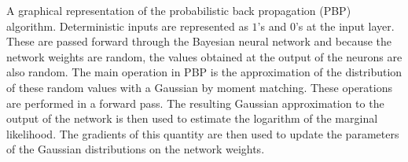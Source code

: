 A graphical representation of the probabilistic back propagation (PBP)
algorithm. Deterministic inputs are represented as $1$'s and $0$'s at the input
layer. These are passed forward through the Bayesian neural network and because
the network weights are random, the values obtained at the output of the
neurons are also random. The main operation in PBP is the approximation of the
distribution of these random values with a Gaussian by moment matching. These
operations are performed in a forward pass. The resulting Gaussian
approximation to the output of the network is then used to estimate the
logarithm of the marginal likelihood. The gradients of this quantity are then
used to update the parameters of the Gaussian distributions on the network
weights.
